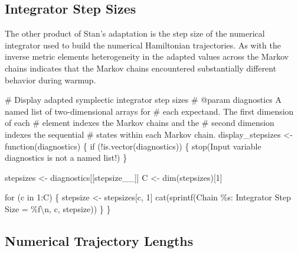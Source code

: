 \documentclass[
  letterpaper,
  DIV=11,
  numbers=noendperiod]{scrartcl}
\newenvironment{Shaded}{\begin{snugshade}}{\end{snugshade}}
\newcommand{\CharTok}[1]{\textcolor[rgb]{0.13,0.47,0.30}{#1}}
\newcommand{\CommentTok}[1]{\textcolor[rgb]{0.37,0.37,0.37}{#1}}
\newcommand{\ControlFlowTok}[1]{\textcolor[rgb]{0.00,0.23,0.31}{#1}}
\newcommand{\DecValTok}[1]{\textcolor[rgb]{0.68,0.00,0.00}{#1}}
\newcommand{\KeywordTok}[1]{\textcolor[rgb]{0.00,0.23,0.31}{#1}}
\newcommand{\NormalTok}[1]{\textcolor[rgb]{0.00,0.23,0.31}{#1}}
\newcommand{\OperatorTok}[1]{\textcolor[rgb]{0.37,0.37,0.37}{#1}}
\newcommand{\SpecialCharTok}[1]{\textcolor[rgb]{0.37,0.37,0.37}{#1}}
\newcommand{\StringTok}[1]{\textcolor[rgb]{0.13,0.47,0.30}{#1}}
\begin{document}
\hypertarget{integrator-step-sizes}{%
\subsection{Integrator Step Sizes}\label{integrator-step-sizes}}

The other product of Stan's adaptation is the step size of the numerical
integrator used to build the numerical Hamiltonian trajectories. As with
the inverse metric elements heterogeneity in the adapted values across
the Markov chains indicates that the Markov chains encountered
substantially different behavior during warmup.

\begin{Shaded}
\begin{Highlighting}[]
\CommentTok{\# Display adapted symplectic integrator step sizes}
\CommentTok{\# @param diagnostics A named list of two{-}dimensional arrays for }
\CommentTok{\#                    each expectand.  The first dimension of each}
\CommentTok{\#                    element indexes the Markov chains and the }
\CommentTok{\#                    second dimension indexes the sequential }
\CommentTok{\#                    states within each Markov chain.}
\NormalTok{display\_stepsizes }\OperatorTok{\textless{}{-}}\NormalTok{ function(diagnostics) \{}
  \ControlFlowTok{if}\NormalTok{ (}\OperatorTok{!}\KeywordTok{is}\NormalTok{.vector(diagnostics)) \{}
\NormalTok{    stop(}\StringTok{\textquotesingle{}Input variable \textasciigrave{}diagnostics\textasciigrave{} is not a named list!\textquotesingle{}}\NormalTok{)}
\NormalTok{  \}}
  
\NormalTok{  stepsizes }\OperatorTok{\textless{}{-}}\NormalTok{ diagnostics[[}\StringTok{\textquotesingle{}stepsize\_\_\textquotesingle{}}\NormalTok{]]}
\NormalTok{  C }\OperatorTok{\textless{}{-}}\NormalTok{ dim(stepsizes)[}\DecValTok{1}\NormalTok{]}
  
  \ControlFlowTok{for}\NormalTok{ (c }\KeywordTok{in} \DecValTok{1}\NormalTok{:C) \{}
\NormalTok{    stepsize }\OperatorTok{\textless{}{-}}\NormalTok{ stepsizes[c, }\DecValTok{1}\NormalTok{]}
\NormalTok{    cat(sprintf(}\StringTok{\textquotesingle{}Chain }\SpecialCharTok{\%s}\StringTok{: Integrator Step Size = }\SpecialCharTok{\%f}\CharTok{\textbackslash{}n}\StringTok{\textquotesingle{}}\NormalTok{,}
\NormalTok{                c, stepsize))}
\NormalTok{  \}}
\NormalTok{\}}
\end{Highlighting}
\end{Shaded}

\hypertarget{numerical-trajectory-lengths}{%
\subsection{Numerical Trajectory
Lengths}\label{numerical-trajectory-lengths}}
\end{document}
